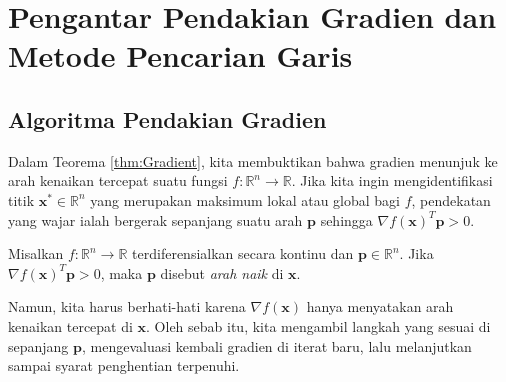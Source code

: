 \chapter{Pengantar Pendakian Gradien dan Metode Pencarian Garis}
\section{Algoritma Pendakian Gradien}
\begin{remark}
Dalam Teorema \ref{thm:Gradient}, kita membuktikan bahwa gradien menunjuk ke arah kenaikan tercepat suatu fungsi $f:\mathbb{R}^n \rightarrow \mathbb{R}$. Jika kita ingin mengidentifikasi titik $\mathbf{x}^* \in \mathbb{R}^n$ yang merupakan maksimum lokal atau global bagi $f$, pendekatan yang wajar ialah bergerak sepanjang suatu arah $\mathbf{p}$ sehingga $\nabla f(\mathbf{x})^T\mathbf{p} > 0$.
\end{remark}
\begin{definition} Misalkan $f:\mathbb{R}^n \rightarrow \mathbb{R}$ terdiferensialkan secara kontinu dan $\mathbf{p} \in \mathbb{R}^n$. Jika $\nabla f(\mathbf{x})^T\mathbf{p} > 0$, maka $\mathbf{p}$ disebut \textit{arah naik} di $\mathbf{x}$.
\label{def:AscentDir}
\end{definition}
\begin{remark}
Namun, kita harus berhati-hati karena $\nabla f(\mathbf{x})$ hanya menyatakan arah kenaikan tercepat di $\mathbf{x}$. Oleh sebab itu, kita mengambil langkah yang sesuai di sepanjang $\mathbf{p}$, mengevaluasi kembali gradien di iterat baru, lalu melanjutkan sampai syarat penghentian terpenuhi.
\end{remark}
